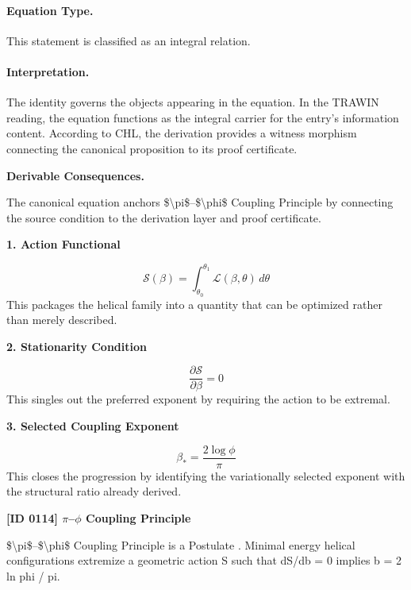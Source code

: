 \paragraph{Equation Type.}
This statement is classified as an integral relation.

\paragraph{Interpretation.}
The identity governs the objects appearing in the equation. In the TRAWIN reading, the equation functions as the integral carrier for the entry’s information content. According to CHL, the derivation provides a witness morphism connecting the canonical proposition to its proof certificate.

\par\vspace{0.35em}
\noindent\textbf{Derivable Consequences.}\quad
\begingroup
\footnotesize
\raggedright
The canonical equation anchors \$\textbackslash{}pi\$--\$\textbackslash{}phi\$ Coupling Principle by connecting the source condition to the derivation layer and proof certificate.
\par\endgroup

\noindent\textbf{1. Action Functional}\par
\[
\mathcal{S}(\beta)=\int_{\theta_0}^{\theta_1}\mathcal{L}(\beta,\theta)\,d\theta
\]
\noindent This packages the helical family into a quantity that can be optimized rather than merely described.\par
\noindent\textbf{2. Stationarity Condition}\par
\[
\frac{\partial \mathcal{S}}{\partial \beta}=0
\]
\noindent This singles out the preferred exponent by requiring the action to be extremal.\par
\noindent\textbf{3. Selected Coupling Exponent}\par
\[
\beta_{\ast}=\frac{2\log \phi}{\pi}
\]
\noindent This closes the progression by identifying the variationally selected exponent with the structural ratio already derived.\par

\clearpage
\noindent\textbf{[ID 0114] $\pi$--$\phi$ Coupling Principle}\par
\vspace{0.35em}
\begingroup\small
{}
\$\textbackslash{}pi\$--\$\textbackslash{}phi\$ Coupling Principle is a Postulate  . Minimal energy helical configurations extremize a geometric action S such that dS/db = 0 implies b = 2 ln phi / pi.  

